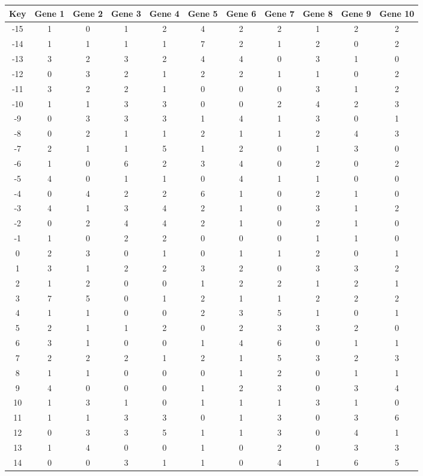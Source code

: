 \begin{tabular}{|c|c|c|c|c|c|c|c|c|c|c|}
\hline
Key & Gene 1 & Gene 2 & Gene 3 & Gene 4 & Gene 5 & Gene 6 & Gene 7 & Gene 8 & Gene 9 & Gene 10 \\
\hline
-15 & 1 & 0 & 1 & 2 & 4 & 2 & 2 & 1 & 2 & 2 \\
-14 & 1 & 1 & 1 & 1 & 7 & 2 & 1 & 2 & 0 & 2 \\
-13 & 3 & 2 & 3 & 2 & 4 & 4 & 0 & 3 & 1 & 0 \\
-12 & 0 & 3 & 2 & 1 & 2 & 2 & 1 & 1 & 0 & 2 \\
-11 & 3 & 2 & 2 & 1 & 0 & 0 & 0 & 3 & 1 & 2 \\
-10 & 1 & 1 & 3 & 3 & 0 & 0 & 2 & 4 & 2 & 3 \\
-9 & 0 & 3 & 3 & 3 & 1 & 4 & 1 & 3 & 0 & 1 \\
-8 & 0 & 2 & 1 & 1 & 2 & 1 & 1 & 2 & 4 & 3 \\
-7 & 2 & 1 & 1 & 5 & 1 & 2 & 0 & 1 & 3 & 0 \\
-6 & 1 & 0 & 6 & 2 & 3 & 4 & 0 & 2 & 0 & 2 \\
-5 & 4 & 0 & 1 & 1 & 0 & 4 & 1 & 1 & 0 & 0 \\
-4 & 0 & 4 & 2 & 2 & 6 & 1 & 0 & 2 & 1 & 0 \\
-3 & 4 & 1 & 3 & 4 & 2 & 1 & 0 & 3 & 1 & 2 \\
-2 & 0 & 2 & 4 & 4 & 2 & 1 & 0 & 2 & 1 & 0 \\
-1 & 1 & 0 & 2 & 2 & 0 & 0 & 0 & 1 & 1 & 0 \\
0 & 2 & 3 & 0 & 1 & 0 & 1 & 1 & 2 & 0 & 1 \\
1 & 3 & 1 & 2 & 2 & 3 & 2 & 0 & 3 & 3 & 2 \\
2 & 1 & 2 & 0 & 0 & 1 & 2 & 2 & 1 & 2 & 1 \\
3 & 7 & 5 & 0 & 1 & 2 & 1 & 1 & 2 & 2 & 2 \\
4 & 1 & 1 & 0 & 0 & 2 & 3 & 5 & 1 & 0 & 1 \\
5 & 2 & 1 & 1 & 2 & 0 & 2 & 3 & 3 & 2 & 0 \\
6 & 3 & 1 & 0 & 0 & 1 & 4 & 6 & 0 & 1 & 1 \\
7 & 2 & 2 & 2 & 1 & 2 & 1 & 5 & 3 & 2 & 3 \\
8 & 1 & 1 & 0 & 0 & 0 & 1 & 2 & 0 & 1 & 1 \\
9 & 4 & 0 & 0 & 0 & 1 & 2 & 3 & 0 & 3 & 4 \\
10 & 1 & 3 & 1 & 0 & 1 & 1 & 1 & 3 & 1 & 0 \\
11 & 1 & 1 & 3 & 3 & 0 & 1 & 3 & 0 & 3 & 6 \\
12 & 0 & 3 & 3 & 5 & 1 & 1 & 3 & 0 & 4 & 1 \\
13 & 1 & 4 & 0 & 0 & 1 & 0 & 2 & 0 & 3 & 3 \\
14 & 0 & 0 & 3 & 1 & 1 & 0 & 4 & 1 & 6 & 5 \\
\hline
\end{tabular}